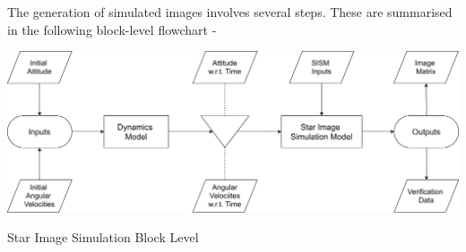 
The generation of simulated images involves several steps. These are summarised in the following block-level flowchart -

\begin{Flowchart}[h!]
    \centering
    \includegraphics[scale=0.06]{Figures/Model/se_BLock_Level_Diagram.png}
    \caption{Star Image Simulation Block Level}
    \label{fig:SIS_Block}
\end{Flowchart}







